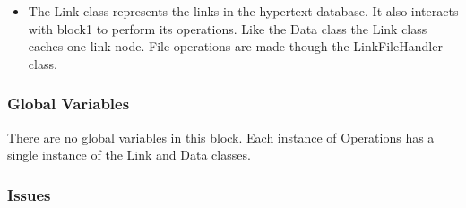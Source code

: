 \begin{itemize}
\item The Link class represents the links in the hypertext database.  It also
  interacts with block1 to perform its operations.  Like the Data class the
  Link class caches one link-node.  File operations are made though the
  LinkFileHandler class. 
%
%

\end{itemize}
\subsubsection*{Global Variables}
There are no global variables in this block.  Each instance of Operations
has a single instance of the Link and Data classes.

\subsubsection*{Issues}

